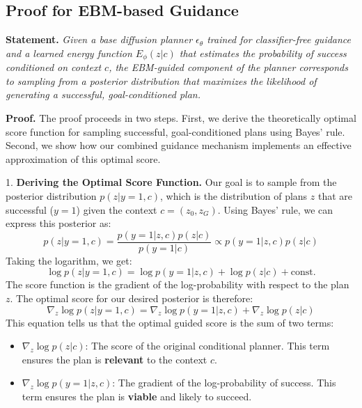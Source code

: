 \documentclass{article} %
\begin{document}
\subsection{Proof for EBM-based Guidance}
\label{proof:emb_guidance}
\textbf{Statement.} \textit{Given a base diffusion planner $\epsilon_\theta$ trained for classifier-free guidance and a learned energy function $E_\phi(z|c)$ that estimates the probability of success conditioned on context $c$, the EBM-guided component of the planner corresponds to sampling from a posterior distribution that maximizes the likelihood of generating a successful, goal-conditioned plan.}

\textbf{Proof.}
The proof proceeds in two steps. First, we derive the theoretically optimal score function for sampling successful, goal-conditioned plans using Bayes' rule. Second, we show how our combined guidance mechanism implements an effective approximation of this optimal score.

1.  \textbf{Deriving the Optimal Score Function.}
    Our goal is to sample from the posterior distribution $p(z|y=1, c)$, which is the distribution of plans $z$ that are successful ($y=1$) given the context $c=(z_0, z_G)$. Using Bayes' rule, we can express this posterior as:
    \[ p(z|y=1, c) = \frac{p(y=1|z, c) p(z|c)}{p(y=1|c)} \propto p(y=1|z, c) p(z|c) \]
    Taking the logarithm, we get:
    \[ \log p(z|y=1, c) = \log p(y=1|z, c) + \log p(z|c) + \text{const.} \]
    The score function is the gradient of the log-probability with respect to the plan $z$. The optimal score for our desired posterior is therefore:
    \[ \nabla_z \log p(z|y=1, c) = \nabla_z \log p(y=1|z, c) + \nabla_z \log p(z|c) \]
    This equation tells us that the optimal guided score is the sum of two terms:
    \begin{itemize}
        \item $\nabla_z \log p(z|c)$: The score of the original conditional planner. This term ensures the plan is \textbf{relevant} to the context $c$.
        \item $\nabla_z \log p(y=1|z, c)$: The gradient of the log-probability of success. This term ensures the plan is \textbf{viable} and likely to succeed.
    \end{itemize}
\end{document}
